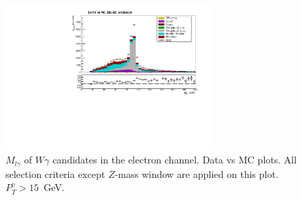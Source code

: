 \begin{figure}[htb]
  \begin{center}
   \includegraphics[width=0.7\textwidth]{../figs/figs_v11/ELECTRON_WGamma/PrepareYields/c_TotalDATAvsMC_EtaCommon__Mpholep1PRELIMINARY_FOR_E_TO_GAMMA_WITH_PSV_CUT_pt15to500_.pdf}
  \caption{$M_{l\gamma}$ of $W\gamma$ candidates in the electron channel. Data vs MC plots. All selection criteria except $Z$-mass window are applied on this plot. $P_T^{\gamma}>15$~GeV. }
  \label{fig:DATAvsMC_Mpholep1}
  \end{center}
\end{figure}

